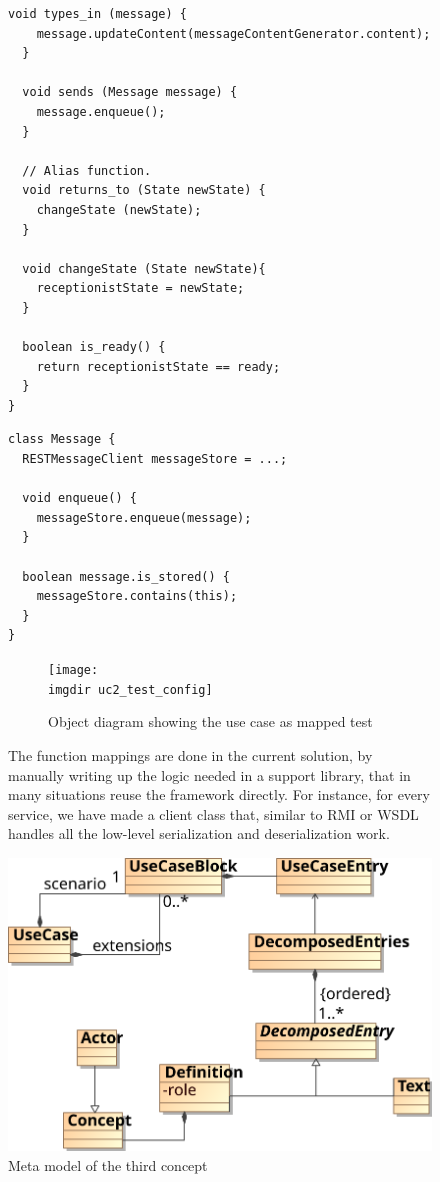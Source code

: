 \begin{figure}[!htbp]
\begin{lstlisting}[caption=Pseudo code representing Receptionist domain actor,label={lst:code_for_receptionist_domain_actor}]
  void types_in (message) {
  	message.updateContent(messageContentGenerator.content);
  }
  
  void sends (Message message) {
    message.enqueue();
  }
  
  // Alias function.
  void returns_to (State newState) {
  	changeState (newState);
  }
  
  void changeState (State newState){
  	receptionistState = newState;
  }
  
  boolean is_ready() {
    return receptionistState == ready;
  }
}
\end{lstlisting}

\begin{lstlisting}[caption=Pseudo code representing Message domain concept,label={lst:code_for_domain_concept}]
class Message {
  RESTMessageClient messageStore = ...;
  
  void enqueue() {
    messageStore.enqueue(message);
  }

  boolean message.is_stored() {
    messageStore.contains(this);
  }
}
\end{lstlisting}

\begin{figure}
 \texttt{[image: \\imgdir uc2\_test\_config]}
 \caption{Object diagram showing the use case as mapped test}
\end{figure}
The function mappings are done in the current solution, by manually writing up the logic needed in a support library, that in many situations reuse the framework directly. For instance, for every service, we have made a client class that, similar to RMI or WSDL handles all the low-level serialization and deserialization work. 

\includegraphics[scale=0.9]{img/3rd_iteration_meta_model}
\centering
\caption{Meta model of the third concept}
\label{fig:3rd_iteration_meta_model}
\end{figure}

